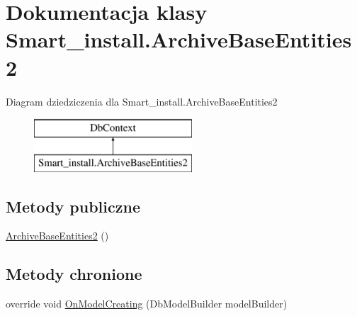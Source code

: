 \hypertarget{class_smart__install_1_1_archive_base_entities2}{\section{Dokumentacja klasy Smart\+\_\+install.\+Archive\+Base\+Entities2}
\label{class_smart__install_1_1_archive_base_entities2}
}
Diagram dziedziczenia dla Smart\+\_\+install.\+Archive\+Base\+Entities2\begin{figure}[H]
\begin{center}
\leavevmode
\includegraphics[height=2.000000cm]{class_smart__install_1_1_archive_base_entities2}
\end{center}
\end{figure}
\subsection*{Metody publiczne}
\begin{DoxyCompactItemize}
\item 
\hyperlink{class_smart__install_1_1_archive_base_entities2_a9ca605fc5a79dc61bdeafa0a6588664a}{Archive\+Base\+Entities2} ()
\end{DoxyCompactItemize}
\subsection*{Metody chronione}
\begin{DoxyCompactItemize}
\item 
override void \hyperlink{class_smart__install_1_1_archive_base_entities2_af346b2a15acf04656b64b4c570a15363}{On\+Model\+Creating} (Db\+Model\+Builder model\+Builder)
\end{DoxyCompactItemize}
